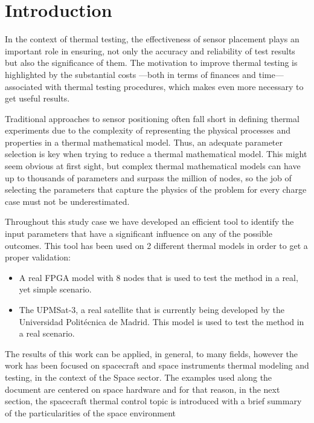 \chapter{Introduction} \label{ch:chapter01}
In the context of thermal testing, the effectiveness of sensor placement plays an important role in ensuring, not only the accuracy and reliability of test results but also the significance of them. The motivation to improve thermal testing is highlighted by the substantial costs —both in terms of finances and time— associated with thermal testing procedures, which makes even more necessary to get useful results.

Traditional approaches to sensor positioning often fall short in defining thermal experiments due to the complexity of representing the physical processes and properties in a thermal mathematical model. Thus, an adequate parameter selection is key when trying to reduce a thermal mathematical model. This might seem obvious at first sight, but  complex thermal mathematical models can have up to thousands of parameters and surpass the million of nodes, so the job of selecting the parameters that capture the physics of the problem for every charge case must not be underestimated.

Throughout this study case we have developed an efficient tool to identify the input parameters that have a significant influence on any of the possible outcomes. This tool has been used on 2 different thermal models in order to get a proper validation:

\begin{itemize}
	
	\item A real FPGA model with 8 nodes that is used to test the method in a real, yet simple scenario.
	\item The UPMSat-3, a real satellite that is currently being developed by the Universidad Politécnica de Madrid. This model is used to test the method in a real scenario.

\end{itemize}

The results of this work can be applied, in general, to many fields, however the work has been focused on spacecraft and space instruments thermal modeling and testing, in the context of the Space sector. The examples used along the document are centered on space hardware and for that reason, in the next section, the spacecraft thermal control topic is introduced with a brief summary of the particularities of the space environment

